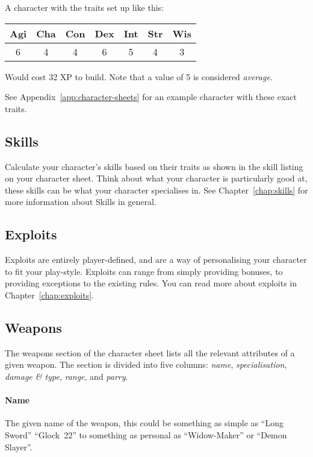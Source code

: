 \begin{example}
A character with the traits set up like this:

\begin{center}
    \begin{tabular}{ccccccc}
        \textbf{Agi} & \textbf{Cha} & \textbf{Con} & \textbf{Dex} & \textbf{Int} & \textbf{Str} & \textbf{Wis} \\\hline
        6 & 4 & 4 & 6 & 5 & 4 & 3\\ 
    \end{tabular}
\end{center}
Would cost 32 XP to build.
Note that a value of 5 is considered \textit{average}.

See Appendix~\ref{app:character-sheets} for an example character with these exact traits.
\end{example}

\subsection{Skills}
Calculate your character's skills based on their traits as shown in the skill listing on your character sheet.
Think about what your character is particularly good at, these skills can be what your character specialises in.
See Chapter~\ref{chap:skills} for more information about Skills in general.

\subsection{Exploits}
Exploits are entirely player-defined, and are a way of personalising your character to fit your play-style.
Exploits can range from simply providing bonuses, to providing exceptions to the existing rules.
You can read more about exploits in Chapter~\ref{chap:exploits}.

\subsection{Weapons}
The weapons section of the character sheet lists all the relevant attributes of a given weapon.
The section is divided into five columns: \textit{name}, \textit{specialisation}, \textit{damage \& type}, \textit{range}, and \textit{parry}.

\paragraph{Name} The given name of the weapon, this could be something as simple as ``Long Sword'' ``Glock~22'' to something as personal as ``Widow-Maker'' or ``Demon Slayer''.

